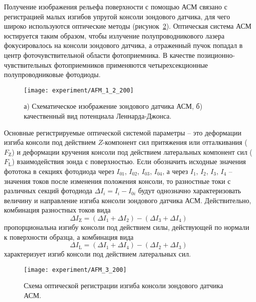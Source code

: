 Получение изображения рельефа поверхности с помощью АСМ связано с регистрацией малых изгибов упругой консоли зондового датчика, для чего широко используются оптические методы (рисунок~\ref{fig:AFM_2}). Оптическая система АСМ юстируется таким образом, чтобы излучение полупроводникового лазера фокусировалось на консоли зондового датчика, а отраженный пучок попадал в центр фоточувствительной области фотоприемника. В качестве позиционно-чувствительных фотоприемников применяются четырехсекционные полупроводниковые фотодиоды.

\begin{figure}[t]
	\centering
	\texttt{[image: experiment/AFM\_1\_2\_200]}
	\vspace{0.5em}
	\caption{а) Схематическое изображение зондового датчика АСМ, б) качественный вид потенциала Леннарда-Джонса.}
	\label{fig:AFM_1_2}
\end{figure}

Основные регистрируемые оптической системой параметры -- это деформации изгиба консоли под действием $Z$-компонент сил притяжения или отталкивания ($F_\mathrm{Z}$) и деформации кручения консоли под действием латеральных компонент сил ($F_\mathrm{L}$) взаимодействия зонда с поверхностью. Если обозначить исходные значения фототока в секциях фотодиода через $I_{01}$, $I_{02}$, $I_{03}$, $I_{04}$, а через $I_{1}$, $I_{2}$, $I_{3}$, $I_{4}$ -- значения токов после изменения положения консоли, то разностные токи с различных секций фотодиода $\Delta I_i = I_i - I_{0i}$ будут однозначно характеризовать величину и направление изгиба консоли зондового датчика АСМ. Действительно, комбинация разностных токов вида
\begin{equation}
	\Delta I_\mathrm{Z} = \left(\Delta I_1+\Delta I_2\right)-\left(\Delta I_3+\Delta I_4\right)
\end{equation}
пропорциональна изгибу консоли под действием силы, действующей по нормали к поверхности образца, а комбинация вида
\begin{equation}
	\Delta I_\mathrm{L} = \left(\Delta I_1+\Delta I_4\right)-\left(\Delta I_2+\Delta I_3\right)
\end{equation}
характеризует изгиб консоли под действием латеральных сил.

\begin{figure}[t]
	\centering
	\texttt{[image: experiment/AFM\_3\_200]}
	\vspace{0.2em}
	\caption{Схема оптической регистрации изгиба консоли зондового датчика АСМ.}
	\label{fig:AFM_2}
\end{figure}

